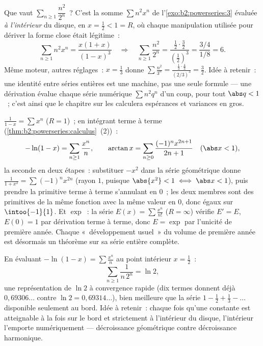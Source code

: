 \begin{example}\label{ex:b2:powerseries:evaluate}
Que vaut $\sum_{n\geq1}\dfrac{n^2}{2^n}$~? C'est la somme
$\sum n^2x^n$ de l'\cref{exo:b2:powerseries:3} évaluée
\emph{à l'intérieur} du disque, en $x = \frac12 < 1 = R$, où chaque
manipulation utilisée pour dériver la forme close était
légitime~:
\[
\sum_{n\geq1} n^2x^n = \frac{x(1+x)}{(1-x)^3}
\quad\Longrightarrow\quad
\sum_{n\geq1}\frac{n^2}{2^n}
= \frac{\frac12\cdot\frac32}{(\frac12)^3}
= \frac{3/4}{1/8} = 6 .
\]
Même moteur, autres réglages~: $x = \frac13$ donne
$\sum\frac{n^2}{3^n} = \frac{\frac13\cdot\frac43}{(2/3)^3} =
\frac32$. Idée à retenir~: une identité entre séries entières est une
machine, pas une seule formule --- une dérivation évalue chaque
série numérique $\sum n^2q^n$ d'un coup, pour tout $\abs q < 1$~;
c'est ainsi que le chapitre sur les  calculera
espérances et variances en gros.
\end{example}

\begin{example}\label{ex:b2:powerseries:classics}
$\displaystyle\frac{1}{1 - x} = \sum x^n$ ($R = 1$)~; en intégrant
terme à terme (\cref{thm:b2:powerseries:calculus}~(2))~:
\[
-\ln(1 - x) = \sum_{n\geq1} \frac{x^n}{n},
\qquad
\arctan x = \sum_{n \geq 0} \frac{(-1)^n x^{2n+1}}{2n+1}
\quad (\abs x < 1),
\]
la seconde en deux étapes~: substituer $-x^2$ dans la série
géométrique donne $\frac{1}{1+x^2} = \sum(-1)^nx^{2n}$ (rayon
$1$, puisque $\abs{x^2} < 1 \iff \abs x < 1$), puis prendre la
primitive terme à terme s'annulant en $0$~; les deux membres sont
des primitives de la même fonction avec la même valeur en $0$,
donc égaux sur $\intoo{-1}{1}$. Et $\exp$~:
la série $E(x) = \sum \frac{x^n}{n!}$ ($R = \infty$) vérifie
$E' = E$, $E(0) = 1$ par dérivation terme à terme, donc $E = \exp$ par
l'unicité de première année. Chaque «~développement usuel~» du
volume de première année est désormais un théorème sur sa série
entière complète.
\end{example}

\begin{example}\label{ex:b2:powerseries:lntwo}
En évaluant $-\ln(1-x) = \sum\frac{x^n}{n}$ au point intérieur
$x = \frac12$~:
\[
\sum_{n\geq1}\frac{1}{n\,2^n} = \ln 2 ,
\]
une représentation de $\ln 2$ à convergence rapide (dix termes
donnent déjà $0{,}69306\ldots$ contre $\ln 2 = 0{,}69314\ldots$),
bien meilleure que la série  $1 - \frac12 + \frac13 -
\dots$ disponible seulement au bord. Idée à retenir~:
chaque fois qu'une constante est atteignable à la fois sur le bord
et strictement à l'intérieur du disque, l'intérieur l'emporte
numériquement --- décroissance géométrique contre décroissance
harmonique.
\end{example}

